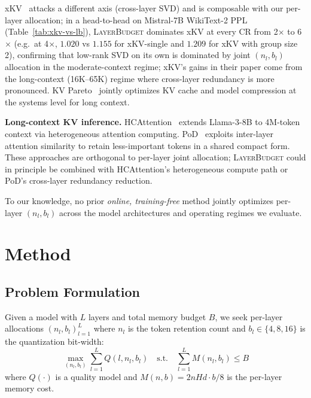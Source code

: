 \documentclass{article}
\newcommand{\layerbudget}{\textsc{LayerBudget}\xspace}
\newcommand{\nlayers}{L}
\newcommand{\nheads}{H}
\newcommand{\hdim}{d}
\begin{document}
xKV~\citep{xkv2025} attacks a different axis (cross-layer SVD) and is composable with our per-layer allocation; in a head-to-head on Mistral-7B WikiText-2 PPL (Table~\ref{tab:xkv-vs-lb}), \layerbudget dominates xKV at every CR from 2$\times$ to 6$\times$ (e.g.\ at 4$\times$, $1.020$ vs $1.155$ for xKV-single and $1.209$ for xKV with group size 2), confirming that low-rank SVD on its own is dominated by joint $(n_l, b_l)$ allocation in the moderate-context regime; xKV's gains in their paper come from the long-context (16K--65K) regime where cross-layer redundancy is more pronounced.
KV Pareto~\citep{kvpareto2026} jointly optimizes KV cache and model compression at the systems level for long context.

\textbf{Long-context KV inference.}
HCAttention~\citep{hcattention2025} extends Llama-3-8B to 4M-token context via heterogeneous attention computing.
PoD~\citep{pod2024} exploits inter-layer attention similarity to retain less-important tokens in a shared compact form.
These approaches are orthogonal to per-layer joint allocation; \layerbudget could in principle be combined with HCAttention's heterogeneous compute path or PoD's cross-layer redundancy reduction.

To our knowledge, no prior \emph{online, training-free} method jointly optimizes per-layer $(n_l, b_l)$ across the model architectures and operating regimes we evaluate.


\section{Method}
\label{sec:method}

\subsection{Problem Formulation}

Given a model with $\nlayers$ layers and total memory budget $B$, we seek per-layer allocations $(n_l, b_l)_{l=1}^{\nlayers}$ where $n_l$ is the token retention count and $b_l \in \{4, 8, 16\}$ is the quantization bit-width:
\begin{equation}
\max_{(n_l, b_l)} \sum_{l=1}^{\nlayers} Q(l, n_l, b_l) \quad \text{s.t.} \quad \sum_{l=1}^{\nlayers} M(n_l, b_l) \leq B
\label{eq:objective}
\end{equation}
where $Q(\cdot)$ is a quality model and $M(n, b) = 2 n \nheads \hdim \cdot b/8$ is the per-layer memory cost.
\end{document}
